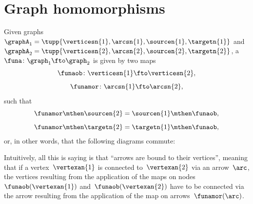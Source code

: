 
\section{Graph homomorphisms}
\begin{ctdefinition}
    \label{def:graph-homomorphism}
    Given graphs~${\graphA}_1=\tupp{\verticesn{1},\arcsn{1},\sourcen{1},\targetn{1}}$ and~${\graphA}_2=\tupp{\verticesn{2},\arcsn{2},\sourcen{2},\targetn{2}}$, a ~$\funa \colon \graph_1 \fto \graph_2$ is given by two maps~
    \begin{equation}
        \funaob\colon \verticesn{1} \fto \verticesn{2},
    \end{equation}
    \begin{equation}
        \funamor\colon \arcsn{1} \fto \arcsn{2},
    \end{equation}
    such that
    \begin{equation}
        \funamor \mthen \sourcen{2} = \sourcen{1}\mthen \funaob,
    \end{equation}
    \begin{equation}
        \funamor \mthen \targetn{2} = \targetn{1}\mthen \funaob,
    \end{equation}
    or, in other words, that the following diagrams commute:
    \begin{center}
    \end{center}
\end{ctdefinition}

\begin{remark}
    Intuitively, all this is saying is that ``arrows are bound to their vertices'', meaning that if a vertex~$\vertexan{1}$ is connected to~$\vertexan{2}$ via an arrow~$\arc$, the vertices resulting from the application of the maps on nodes~$\funaob(\vertexan{1})$ and~$\funaob(\vertexan{2})$ have to be connected via the arrow resulting from the application of the map on arrows~$\funamor(\arc)$.
\end{remark}

